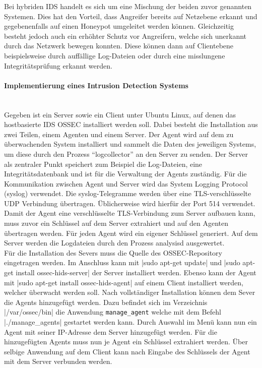 \noindent Bei hybriden \ac{IDS} handelt es sich um eine Mischung der beiden zuvor genannten Systemen. Dies hat den Vorteil, dass Angreifer bereits auf Netzebene erkannt und gegebenenfalls auf einen Honeypot umgeleitet werden können. Gleichzeitig besteht jedoch auch ein erhöhter Schutz vor Angreifern, welche sich unerkannt durch das Netzwerk bewegen konnten. Diese können dann auf Clientebene beispielsweise durch auffällige Log-Dateien oder durch eine misslungene Integritätsprüfung erkannt werden.

\paragraph{Implementierung eines Intrusion Detection Systems}

\noindent \\Gegeben ist ein Server sowie ein Client unter Ubuntu Linux, auf denen das hostbasierte IDS OSSEC installiert werden soll. Dabei besteht die Installation aus zwei Teilen, einem Agenten und einem Server. Der Agent wird auf dem zu überwachenden System installiert und sammelt die Daten des jeweiligen Systems, um diese durch den Prozess "`logcollector"' an den Server zu senden. Der Server als zentraler Punkt speichert zum Beispiel die Log-Dateien, eine Integritätsdatenbank und ist für die Verwaltung der Agents zuständig. Für die Kommunikation zwischen Agent und Server wird das System Logging Protocol (syslog) verwendet. Die syslog-Telegramme werden über eine \ac{TLS}-verschlüsselte UDP Verbindung übertragen. Üblicherweise wird hierfür der Port 514 verwendet. Damit der Agent eine verschlüsselte \ac{TLS}-Verbindung zum Server aufbauen kann, muss zuvor ein Schlüssel auf dem Server extrahiert und auf den Agenten übertragen werden. Für jeden Agent wird ein eigener Schlüssel generiert. Auf dem Server werden die Logdateien durch den Prozess analysisd ausgewertet.\\

\noindent Für die Installation des Severs muss die Quelle des OSSEC-Repository eingetragen werden. Im Anschluss kann mit |sudo apt-get update| und |sudo apt-get install ossec-hids-server| der Server installiert werden. 
Ebenso kann der Agent mit |sudo apt-get install ossec-hids-agent| auf einem Client installiert werden, welcher überwacht werden soll. Nach vollständiger Installation können dem Sever die Agents hinzugefügt werden. Dazu befindet sich im Verzeichnis |/var/ossec/bin| die Anwendung \verb+manage_agent+ welche mit dem Befehl |./manage_agents| gestartet werden kann. 
Durch Auswahl im Menü kann nun ein Agent mit seiner IP-Adresse dem Server hinzugefügt werden. Für die hinzugefügten Agents muss nun je Agent ein Schlüssel extrahiert werden. Über selbige Anwendung auf dem Client kann nach Eingabe des Schlüssels der Agent mit dem Server verbunden werden.\\

